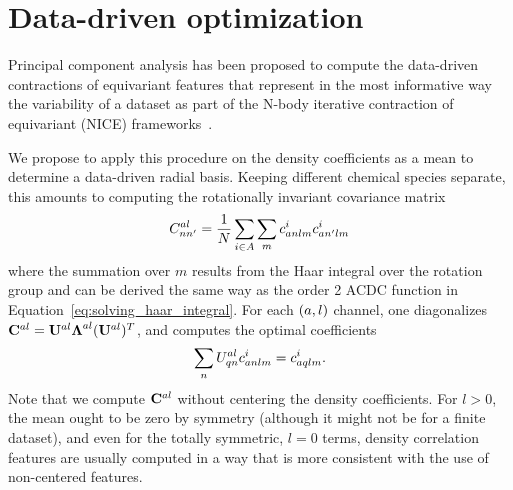 \section{Data-driven optimization}
Principal component analysis has been proposed to compute the data-driven contractions of equivariant features that represent in the most informative way the variability of a dataset as part of the N-body iterative contraction of equivariant (NICE) frameworks~\cite{niga+20jcp}.

We propose to apply this procedure on the density coefficients as a mean to determine a data-driven radial basis. 
Keeping different chemical species separate, this amounts to computing the rotationally invariant covariance matrix
\begin{equation}
  C^{a l}_{nn'}= \frac{1}{N} \sum_{i\in A} \sum_m c^i_{a nlm}c^i_{a n^\prime lm}
\label{eq:cov}
\end{equation}
where the summation over $m$ results from the Haar integral over the rotation group and can be derived the same way as the order 2 ACDC function in Equation~\ref{eq:solving_haar_integral}.
For each $(a, l)$ channel, one diagonalizes $\mathbf{C}^{al}=\mathbf{U}^{al} \boldsymbol{\Lambda}^{al} (\mathbf{U}^{al})^T$, and computes the optimal coefficients
\begin{equation}
  \sum_n U^{a l}_{qn} c^i_{a nlm} = c^i_{a qlm} \label{eq:contract}.
\end{equation}
Note that we compute $\mathbf{C}^{al}$ without centering the density coefficients. For $l>0$, the mean ought to be zero by symmetry (although it might not be for a finite dataset), and even for the totally symmetric, $l=0$ terms, density correlation features are usually computed in a way that is more consistent with the use of non-centered features. 

